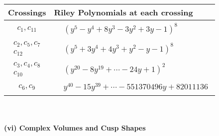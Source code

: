 \documentclass[1p]{elsarticle_modified}
\theoremstyle{definition}
\begin{document}
\begin{tabular}{m{50pt}|m{274pt}}
Crossings & \hspace{64pt}Riley Polynomials at each crossing \\
\hline $$\begin{aligned}c_{1},c_{11}\end{aligned}$$&$\begin{aligned}
&(y^5- y^4+8 y^3-3 y^2+3 y-1)^8
\end{aligned}$\\
\hline $$\begin{aligned}c_{2},c_{5},c_{7}\\c_{12}\end{aligned}$$&$\begin{aligned}
&(y^5+3 y^4+4 y^3+y^2- y-1)^8
\end{aligned}$\\
\hline $$\begin{aligned}c_{3},c_{4},c_{8}\\c_{10}\end{aligned}$$&$\begin{aligned}
&(y^{20}-8 y^{19}+\cdots-24 y+1)^{2}
\end{aligned}$\\
\hline $$\begin{aligned}c_{6},c_{9}\end{aligned}$$&$\begin{aligned}
&y^{40}-15 y^{39}+\cdots-551370496 y+82011136
\end{aligned}$\\
\hline
\end{tabular}\\~\\
\newpage\flushleft \textbf{(vi) Complex Volumes and Cusp Shapes}
\end{document}
